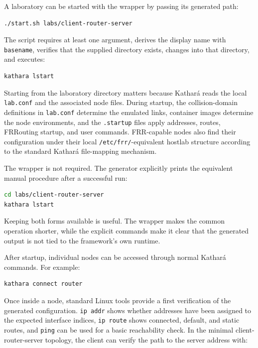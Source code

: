 A laboratory can be started with the wrapper by passing its generated path:

\begin{lstlisting}[language=bash,caption={Starting a generated laboratory.},label={lst:start-lab}]
./start.sh labs/client-router-server
\end{lstlisting}

The script requires at least one argument, derives the display name with
\texttt{basename}, verifies that the supplied directory exists, changes into
that directory, and executes:

\begin{lstlisting}[language=bash,caption={Kathar\'a command executed by start.sh.},label={lst:kathara-lstart}]
kathara lstart
\end{lstlisting}

Starting from the laboratory directory matters because Kathar\'a reads the
local \texttt{lab.conf} and the associated node files. During startup, the
collision-domain definitions in \texttt{lab.conf} determine the emulated links,
container images determine the node environments, and the \texttt{.startup}
files apply addresses, routes, FRRouting startup, and user commands. FRR-capable
nodes also find their configuration under their local
\texttt{/etc/frr/}-equivalent hostlab structure according to the standard
Kathar\'a file-mapping mechanism.

The wrapper is not required. The generator explicitly prints the equivalent
manual procedure after a successful run:

\begin{lstlisting}[language=bash,caption={Starting a laboratory without the wrapper.},label={lst:start-manual}]
cd labs/client-router-server
kathara lstart
\end{lstlisting}

Keeping both forms available is useful. The wrapper makes the common operation
shorter, while the explicit commands make it clear that the generated output is
not tied to the framework's own runtime.

After startup, individual nodes can be accessed through normal Kathar\'a
commands. For example:

\begin{lstlisting}[language=bash,caption={Connecting to a generated router.},label={lst:kathara-connect}]
kathara connect router
\end{lstlisting}

Once inside a node, standard Linux tools provide a first verification of the
generated configuration. \texttt{ip addr} shows whether addresses have been
assigned to the expected interface indices, \texttt{ip route} shows connected,
default, and static routes, and \texttt{ping} can be used for a basic
reachability check. In the minimal client-router-server topology, the client
can verify the path to the server address with:

